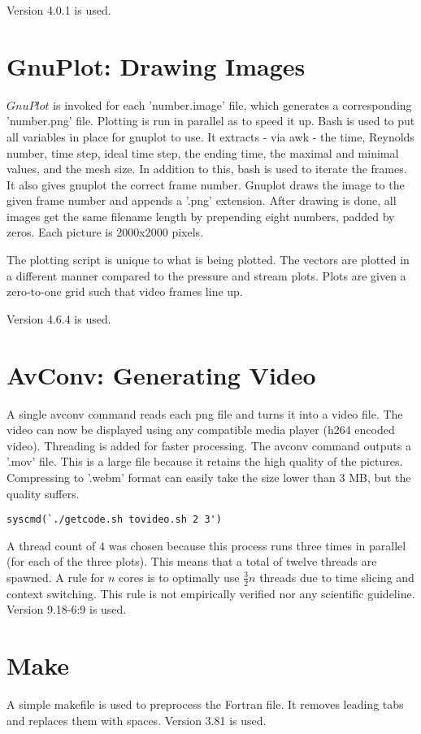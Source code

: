 \documentclass[listof=totoc]{report}
\begin{document}
\noindent Version 4.0.1 is used.


\section{GnuPlot: Drawing Images}
$GnuPlot$ is invoked for each 'number.image' file, which generates a corresponding 'number.png' file. Plotting is run in parallel as to speed it up. Bash is used to put all variables in place for gnuplot to use. It extracts - via awk - the time, Reynolds number, time step, ideal time step, the ending time, the maximal and minimal values, and the mesh size. In addition to this, bash is used to iterate the frames. It also gives gnuplot the correct frame number. Gnuplot draws the image to the given frame number and appends a '.png' extension. After drawing is done, all images get the same filename length by prepending eight numbers, padded by zeros. Each picture is 2000x2000 pixels.

The plotting script is unique to what is being plotted. The vectors are plotted in a different manner compared to the pressure and stream plots. Plots are given a zero-to-one grid such that video frames line up.

\noindent Version 4.6.4 is used.

\section{AvConv: Generating Video}
A single avconv command reads each png file and turns it into a video file. The video can now be displayed using any compatible media player (h264 encoded video). Threading is added for faster processing. The avconv command outputs a '.mov' file. This is a large file because it retains the high quality of the pictures. Compressing to '.webm' format can easily take the size lower than 3 MB, but the quality suffers.

\begin{verbatim}
syscmd(`./getcode.sh tovideo.sh 2 3')
\end{verbatim}

A thread count of $4$ was chosen because this process runs three times in parallel (for each of the three plots). This means that a total of twelve threads are spawned. A rule for $n$ cores is to optimally use $\frac{3}{2} n$ threads due to time slicing and context switching. This rule is not empirically verified nor any scientific guideline.
\noindent Version 9.18-6:9 is used.

\section{Make}
A simple makefile is used to preprocess the Fortran file. It removes leading tabs and replaces them with spaces.
\noindent Version 3.81 is used.
\end{document}
